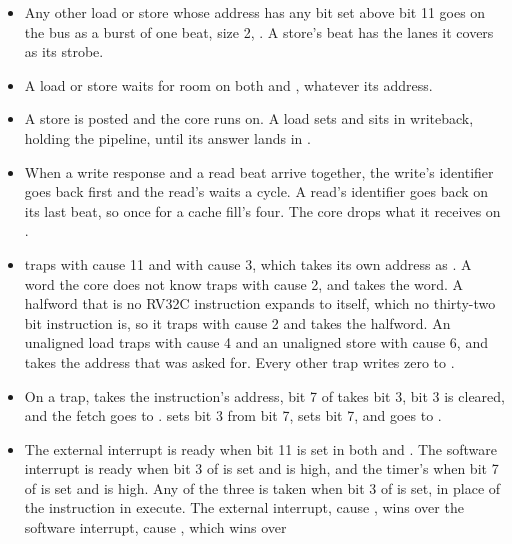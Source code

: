 \begin{itemize}
A load's word comes from  the cycle after it ran, and
never sets ; a store writes the lanes in the cycle it
runs and is not counted in ;  and
 act there as on the bus, and an AMO takes its word into
 in its first cycle in writeback and stores to the lanes.
A load there clears , since nothing refuses it.
\item Any other load or store whose address has any bit set above bit
11 goes on the bus as a burst of one beat, size 2, . A store's beat
has the lanes it covers as its strobe.
\item A load or store waits for room on both  and
, whatever its address.
\item A store is posted and the core runs on. A load sets
 and sits in writeback, holding the pipeline, until
its answer lands in .
\item When a write response and a read beat arrive together, the
write's identifier goes back first and the read's waits a cycle. A
read's identifier goes back on its last beat, so once for a cache
fill's four. The core drops what it receives on .
\item {} traps with cause 11 and  with cause 3,
which takes its own address as . A word the core does not
know traps with cause 2, and  takes the word. A halfword
that is no RV32C instruction expands to itself, which no thirty-two bit
instruction is, so it traps with cause 2 and  takes the
halfword. An unaligned load traps with cause 4 and an unaligned store
with cause 6, and  takes the address that was asked for.
Every other trap writes zero to .
\item On a trap,  takes the instruction's address, bit 7 of
 takes bit 3, bit 3 is cleared, and the fetch goes to
.  sets bit 3 from bit 7, sets bit 7, and goes
to .
\item The external interrupt is ready when bit 11 is set in both
 and . The software interrupt is ready when bit 3
of  is set and  is high, and the timer's when bit
7 of  is set and  is high. Any of the three is
taken when bit 3 of  is set, in place of the instruction
in execute. The external interrupt, cause , wins
over the software interrupt, cause , which wins over

\end{itemize}
